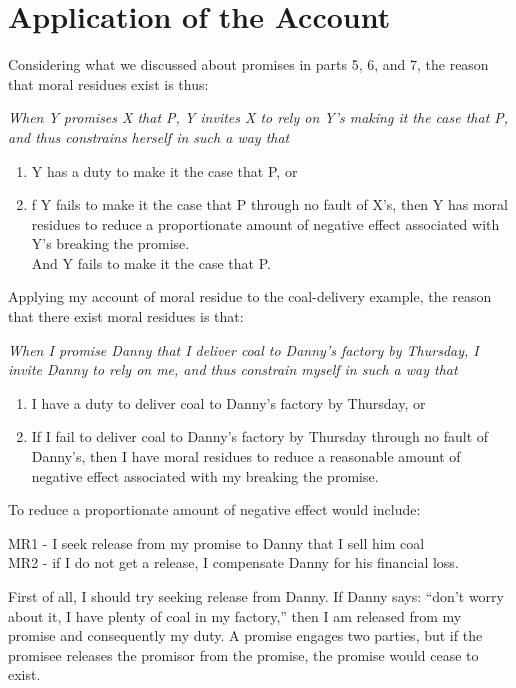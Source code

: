 \section{Application of the Account}

Considering what we discussed about promises in parts 5, 6, and 7, the
reason that moral residues exist is thus:

\begin{displayquote} \def\labelenumi{(\arabic{enumi})}
	\itshape When Y promises X that P, Y invites X to rely on Y's making it the
case that P, and thus constrains herself in such a way that
	\begin{enumerate}
		\item Y has a duty to make it the case that P, or
		\item f Y fails to make it the case that P through no fault of X's,
then Y has moral residues to reduce a proportionate amount of negative
effect associated with Y's breaking the promise. \\
			
			And Y fails to make it the case that P.
	\end{enumerate}
\end{displayquote}
\noindent
Applying my account of moral residue to the coal-delivery example, the
reason that there exist moral residues is that:

\begin{displayquote} \def\labelenumi{(\arabic{enumi})}
 \itshape When I promise Danny that I deliver coal to Danny's factory by
Thursday, I invite Danny to rely on me, and thus constrain myself in
such a way that
	\begin{enumerate}
		\item I have a duty to deliver coal to Danny's factory by Thursday,
or
		\item If I fail to deliver coal to Danny's factory by Thursday
through no fault of Danny's, then I have moral residues to reduce a
reasonable amount of negative effect associated with my breaking the
promise. 
	\end{enumerate}
\end{displayquote}

\noindent
To reduce a proportionate amount of negative effect would include:

\begin{displayquote} \def\labelenumi{(\arabic{enumi})}
	\textsc{MR1} - I seek release from my promise to Danny that I sell him
coal \\
	\textsc{MR2} - if I do not get a release, I compensate Danny for his
financial loss.
\end{displayquote}
\noindent
First of all, I should try seeking release from Danny. If Danny says:
``don't worry about it, I have plenty of coal in my factory,'' then I am
released from my promise and consequently my duty. A promise engages two
parties, but if the promisee releases the promisor from the promise, the
promise would cease to exist.

